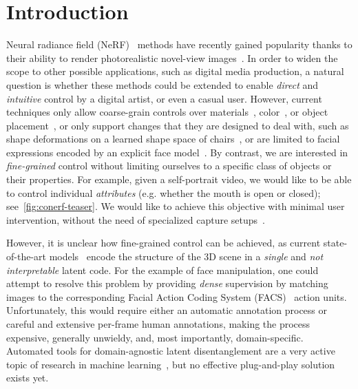 \section{Introduction}
  \label{sec:conerf-intro}
  Neural radiance field (NeRF)~\cite{mildenhall2020nerf} methods have recently
  gained popularity thanks to their ability to render photorealistic novel-view
  images~\cite{martin2021nerfw,
    park2020deformable,park2021hypernerf,zhang2020nerf++}.
  In order to widen the scope to other possible applications, such as digital
  media production, a natural question is whether these methods could be
  extended to enable \textit{direct} and \textit{intuitive} control by a digital
  artist, or even a casual user.
  However, current techniques only allow coarse-grain controls over
  materials~\cite{zhang2021nerfactor}, color~\cite{jang2021codenerf}, or object
  placement~\cite{yang2021learning}, or only support changes that they are
  designed to deal with, such as shape deformations on a learned shape space of
  chairs~\cite{liu2021editing}, or are limited to facial expressions encoded by
  an explicit face model~\cite{gafni2021dynamic}.
  By contrast, we are interested in \textit{fine-grained} control without
  limiting ourselves to a specific class of objects or their properties.
  For example, given a self-portrait video, we would like to be able to control
  individual \textit{attributes} (e.g. whether the mouth is open or closed);
  see~\cref{fig:conerf-teaser}.
  We would like to achieve this objective with minimal user intervention,
  without the need of specialized capture setups~\cite{liu2021neural}.

  However, it is unclear how fine-grained control can be achieved, as current
  state-of-the-art models~\cite{park2021hypernerf} encode the structure of the
  3D scene in a \textit{single} and \textit{not interpretable} latent code.
  For the example of face manipulation, one could attempt to resolve this
  problem by providing \textit{dense} supervision by matching images to the
  corresponding Facial Action Coding System (FACS)~\cite{facs} action units.
  Unfortunately, this would require either an automatic annotation process or
  careful and extensive per-frame human annotations, making the process
  expensive, generally unwieldy, and, most importantly, domain-specific.
  Automated tools for domain-agnostic latent disentanglement are a very active
  topic of research in machine learning~\cite{higgins2016beta,
    higgins2018towards, chen2016infogan}, but no effective plug-and-play solution
  exists yet.

